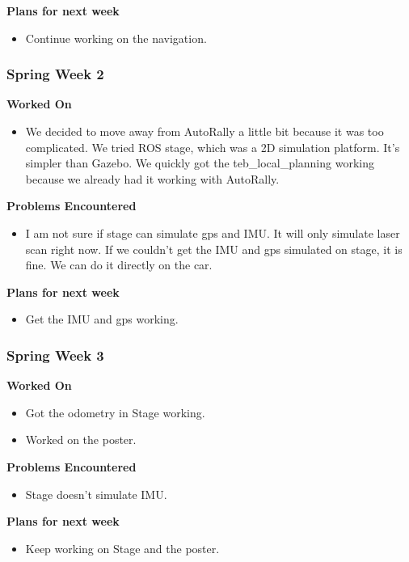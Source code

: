 \documentclass[compsoc,draftclsnofoot,onecolumn,10pt]{IEEEtran}
\begin{document}
\textbf{Plans for next week}
\begin{itemize}
  \item Continue working on the navigation.
\end{itemize}


\subsubsection*{Spring Week 2}

\textbf{Worked On}
\begin{itemize}
  \item We decided to move away from AutoRally a little bit because it was
  too complicated. We tried ROS stage, which was a 2D simulation platform.
  It's simpler than Gazebo. We quickly got the teb\_local\_planning working
  because we already had it working with AutoRally.
\end{itemize}

\textbf{Problems Encountered}
\begin{itemize}
  \item I am not sure if stage can simulate gps and IMU. It will only simulate
  laser scan right now. If we couldn't get the IMU and gps simulated on
  stage, it is fine. We can do it directly on the car.
\end{itemize}

\textbf{Plans for next week}
\begin{itemize}
  \item Get the IMU and gps working.
\end{itemize}


\subsubsection*{Spring Week 3}
\textbf{Worked On}
\begin{itemize}
  \item Got the odometry in Stage working.
  \item Worked on the poster.
\end{itemize}
\textbf{Problems Encountered}
\begin{itemize}
  \item Stage doesn't simulate IMU.
\end{itemize}
\textbf{Plans for next week}
\begin{itemize}
  \item Keep working on Stage and the poster.
\end{itemize}
\end{document}
